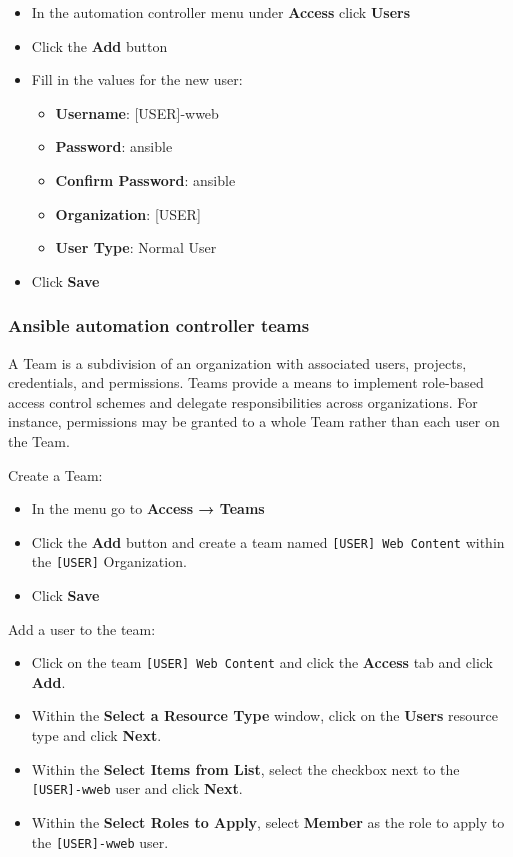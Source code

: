 \begin{itemize}
\item
  In the automation controller menu under \textbf{Access} click
  \textbf{Users}
\item
  Click the \textbf{Add} button
\item
  Fill in the values for the new user:

        \begin{itemize}
            \item \textbf{Username}: [USER]-wweb
            \item \textbf{Password}: ansible
            \item \textbf{Confirm Password}: ansible
            \item \textbf{Organization}: [USER]
            \item \textbf{User Type}: Normal User
        \end{itemize}

\item
  Click \textbf{Save}
\end{itemize}

\hypertarget{ansible-automation-controller-teams}{%
\subsubsection{Ansible automation controller
teams}\label{ansible-automation-controller-teams}}

A Team is a subdivision of an organization with associated users,
projects, credentials, and permissions. Teams provide a means to
implement role-based access control schemes and delegate
responsibilities across organizations. For instance, permissions may be
granted to a whole Team rather than each user on the Team.

Create a Team:

\begin{itemize}
\item
  In the menu go to \textbf{Access → Teams}
\item
  Click the \textbf{Add} button and create a team named
  \texttt{[USER] Web\ Content} within the \texttt{[USER]} Organization.
\item
  Click \textbf{Save}
\end{itemize}

Add a user to the team:

\begin{itemize}
\item
  Click on the team \texttt{[USER] Web\ Content} and click the \textbf{Access}
  tab and click \textbf{Add}.
\item
  Within the \textbf{Select a Resource Type} window, click on the
  \textbf{Users} resource type and click \textbf{Next}.
\item
  Within the \textbf{Select Items from List}, select the checkbox next
  to the \texttt{[USER]-wweb} user and click \textbf{Next}.
\item
  Within the \textbf{Select Roles to Apply}, select \textbf{Member} as
  the role to apply to the \texttt{[USER]-wweb} user.
\end{itemize}

